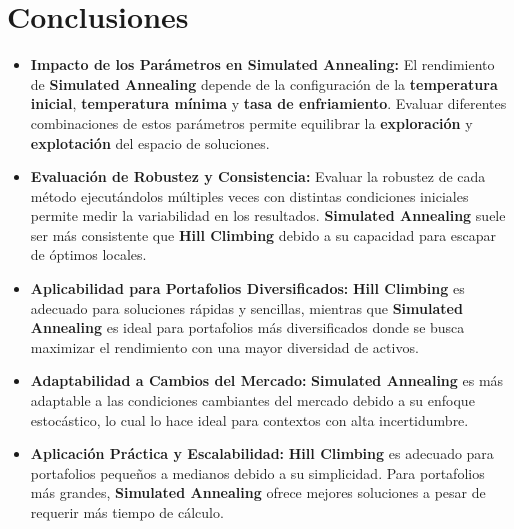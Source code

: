\documentclass[9pt,a4paper,twoside]{rho-class/rho}
\begin{document}
    \section{Conclusiones}
        \begin{itemize}
            \item \textbf{Impacto de los Parámetros en Simulated Annealing:} El rendimiento de \textbf{Simulated Annealing} depende de la configuración de la \textbf{temperatura inicial}, \textbf{temperatura mínima} y \textbf{tasa de enfriamiento}. Evaluar diferentes combinaciones de estos parámetros permite equilibrar la \textbf{exploración} y \textbf{explotación} del espacio de soluciones.

            \item \textbf{Evaluación de Robustez y Consistencia:} Evaluar la robustez de cada método ejecutándolos múltiples veces con distintas condiciones iniciales permite medir la variabilidad en los resultados. \textbf{Simulated Annealing} suele ser más consistente que \textbf{Hill Climbing} debido a su capacidad para escapar de óptimos locales.
            
            \item \textbf{Aplicabilidad para Portafolios Diversificados:} \textbf{Hill Climbing} es adecuado para soluciones rápidas y sencillas, mientras que \textbf{Simulated Annealing} es ideal para portafolios más diversificados donde se busca maximizar el rendimiento con una mayor diversidad de activos.
            
            \item \textbf{Adaptabilidad a Cambios del Mercado:} \textbf{Simulated Annealing} es más adaptable a las condiciones cambiantes del mercado debido a su enfoque estocástico, lo cual lo hace ideal para contextos con alta incertidumbre.
            
            \item \textbf{Aplicación Práctica y Escalabilidad:} \textbf{Hill Climbing} es adecuado para portafolios pequeños a medianos debido a su simplicidad. Para portafolios más grandes, \textbf{Simulated Annealing} ofrece mejores soluciones a pesar de requerir más tiempo de cálculo.
            
        \end{itemize}
    \renewcommand{\contentsname}{Tabla de Contenidos}
    \tableofcontents
    \linenumbers

\printbibliography

\end{document}
